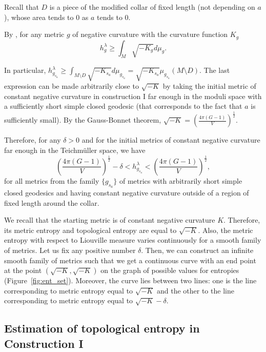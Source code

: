 \documentclass[12pt]{article}
\numberwithin{equation}{section}
\theoremstyle{definition}
\begin{document}
Recall that $D$ is a piece of the modified collar of fixed length (not depending on $a$), whose area tends to $0$ as $a$ tends to $0$. 

By \cite{M81}, for any metric $g$ of negative curvature  with the curvature function $K_g$
\begin{equation*}
h^\lambda_{g}\geqslant\int_M\sqrt{-K_g}d\mu_{g}.
\end{equation*}

In particular, 
$h^\lambda_{g_{s_a}}\geqslant\int_{M\setminus D}\sqrt{-K_{s_a}}d\mu_{g_{s_a}} = \sqrt{-K_{s_a}}\mu_{g_{s_a}} (M\setminus D)$. The last expression can be made arbitrarily close to $\sqrt{-K}$ by taking the initial metric of constant negative curvature in construction I far enough in the moduli  space with a sufficiently short simple closed geodesic (that corresponds to the fact that $a$ is sufficiently small). By the Gauss-Bonnet theorem, $\sqrt{-K} = \left(\frac{4\pi(G-1)}{V}\right)^{\frac{1}{2}}$.

Therefore, for any $\delta >0$ and for the initial metrics of constant negative curvature far enough in the Teichm\"uller space, we have 
\begin{equation*}
\left(\frac{4\pi(G-1)}{V}\right)^{\frac{1}{2}}-\delta<h^\lambda_{g_{s_a}}<\left(\frac{4\pi(G-1)}{V}\right)^{\frac{1}{2}},
\end{equation*}
for all metrics from the family $\{g_{s_a}\}$ of metrics with arbitrarily short simple closed geodesics and having constant negative curvature outside of a region of fixed length around the collar. 

We recall that the starting metric is of constant negative curvature $K$. Therefore, its metric entropy and topological entropy are equal to $\sqrt{-K}$. Also, the metric entropy with respect to Liouville measure varies continuously for a smooth family of metrics. Let us fix any positive number $\delta$. Then, we can construct an infinite smooth family of metrics such that we get a continuous curve with an end point at the point $(\sqrt{-K},\sqrt{-K})$ on the graph of possible values for entropies (Figure~\ref{fig:ent_set}). Moreover, the curve lies between two lines: one is the line corresponding to metric entropy equal to $\sqrt{-K}$ and the other to the line corresponding to metric entropy equal to $\sqrt{-K}-\delta$. 
 
\subsection{Estimation of topological entropy in Construction I}\label{top_1}
\end{document}

